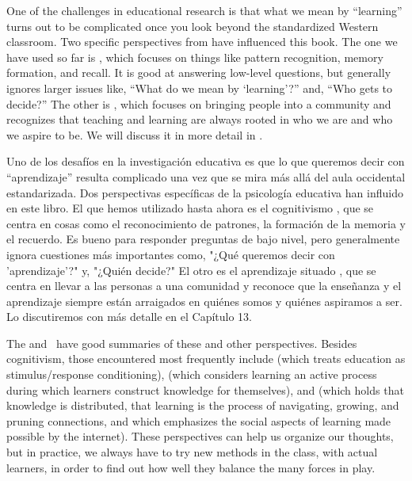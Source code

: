 One of the challenges in educational research is that
what we mean by ``learning'' turns out to be complicated
once you look beyond the standardized Western classroom.
Two specific perspectives from  have influenced this book.
The one we have used so far is ,
which focuses on things like pattern recognition, memory formation, and recall.
It is good at answering low-level questions,
but generally ignores larger issues like,
``What do we mean by `learning'?''
and, ``Who gets to decide?''
The other is ,
which focuses on bringing people into a community
and recognizes that
teaching and learning are always rooted in who we are and who we aspire to be.
We will discuss it in more detail in .

Uno de los desafíos en la investigación educativa es que lo que queremos decir con “aprendizaje” resulta complicado una vez que se mira más allá del aula occidental estandarizada. Dos perspectivas específicas de la psicología educativa han influido en este libro. El que hemos utilizado hasta ahora es el cognitivismo , que se centra en cosas como el reconocimiento de patrones, la formación de la memoria y el recuerdo. Es bueno para responder preguntas de bajo nivel, pero generalmente ignora cuestiones más importantes como, "¿Qué queremos decir con 'aprendizaje'?" y, "¿Quién decide?" El otro es el aprendizaje situado , que se centra en llevar a las personas a una comunidad y reconoce que la enseñanza y el aprendizaje siempre están arraigados en quiénes somos y quiénes aspiramos a ser. Lo discutiremos con más detalle en el Capítulo  13.


The 
and~\cite{Wibu2016}
have good summaries of these and other perspectives.
Besides cognitivism,
those encountered most frequently include 
(which treats education as stimulus/response conditioning),
(which considers learning an active process during which learners construct knowledge for themselves),
and 
(which holds that knowledge is distributed,
that learning is the process of navigating, growing, and pruning connections,
and which emphasizes the social aspects of learning made possible by the internet).
These perspectives can help us organize our thoughts,
but in practice,
we always have to try new methods in the class,
with actual learners,
in order to find out how well they balance the many forces in play.


